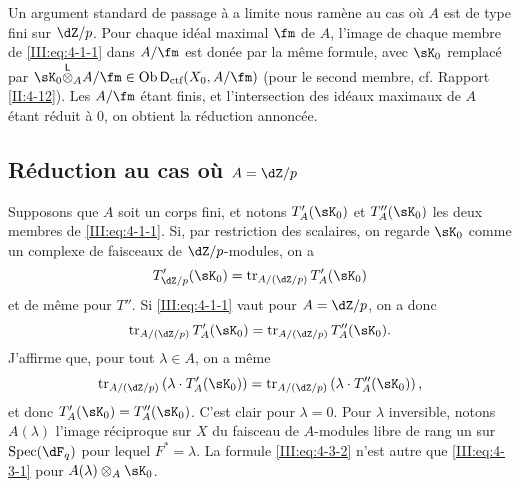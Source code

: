Un argument standard de passage à a limite nous ramène au cas où $A$ est 
de type fini sur $\dZ/p$. Pour chaque idéal maximal $\fm$ de $A$, l'image de 
chaque membre de \eqref{III:eq:4-1-1} dans $A/\fm$ est donée par la même 
formule, avec $\sK_0$ remplacé par 
$\sK_0\lotimes_A A/\fm\in\ob\D_\text{ctf}(X_0,A/\fm)$ (pour le second membre, 
cf. Rapport \ref{II:4-12}). Les $A/\fm$ étant finis, et l'intersection des 
idéaux maximaux de $A$ étant réduit à $0$, on obtient la réduction 
annoncée.





\subsection{Réduction au cas où \texorpdfstring{$A=\dZ/p$}{A=Z/p}}\label{III:4-3}

Supposons que $A$ soit un corps fini, et notons $T_A'(\sK_0)$ et $T_A''(\sK_0)$ 
les deux membres de \eqref{III:eq:4-1-1}. Si, par restriction des scalaires, on 
regarde $\sK_0$ comme un complexe de faisceaux de $\dZ/p$-modules, on a 
\[
  T_{\dZ/p}'(\sK_0) = \tr_{A/(\dZ/p)} T_A'(\sK_0)
\]
et de même pour $T''$. Si \eqref{III:eq:4-1-1} vaut pour $A=\dZ/p$, on a donc 
\begin{equation}\label{III:eq:4-3-1}
  \tr_{A/(\dZ/p)} T_A'(\sK_0) = \tr_{A/(\dZ/p)} T_A''(\sK_0) \text{.}
\end{equation}
J'affirme que, pour tout $\lambda\in A$, on a même 
\begin{equation}\label{III:eq:4-3-2}
  \tr_{A/(\dZ/p)}\left(\lambda\cdot T_A'(\sK_0)\right) = \tr_{A/(\dZ/p)}\left(\lambda\cdot T_A''(\sK_0)\right) \text{,}
\end{equation}
et donc $T_A'(\sK_0) = T_A''(\sK_0)$. C'est clair pour $\lambda=0$. Pour 
$\lambda$ inversible, notons $A(\lambda)$ l'image réciproque sur $X$ du 
faisceau de $A$-modules libre de rang un sur $\spec(\dF_q)$ pour lequel 
$F^*=\lambda$. La formule \eqref{III:eq:4-3-2} n'est autre que 
\eqref{III:eq:4-3-1} pour $A(\lambda)\otimes_A \sK_0$. 





